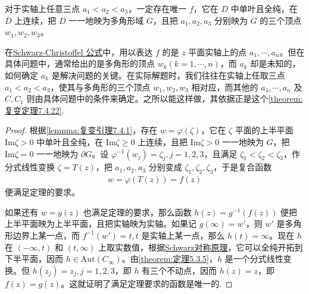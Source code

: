 \documentclass[../../main.tex]{subfiles}%
\begin{document}
\begin{theorem}\label{theorem:复变定理7.4.22}
对于实轴上任意三点 \(a_1<a_2<a_3\)，一定存在唯一 \(f\)，它在 \(D\) 中单叶且全纯，在 \(\overline{D}\) 上连续，把 \(D\) 一一地映为多角形域 \(G\)，且把 \(a_1,a_2,a_3\) 分别映为 \(G\) 的三个顶点 \(w_1,w_2,w_3\)。
\end{theorem}
\begin{remark}
在\hyperref[eq:Schwarz-Christoffel公式]{Schwarz-Christoffel 公式}中，用以表达 \(f\) 的是 \(z\) 平面实轴上的点 \(a_1,\cdots,a_n\)。但在具体问题中，通常给出的是多角形的顶点 \(w_k(k=1,\cdots,n)\)，而 \(a_k\) 却是未知的，如何确定 \(a_k\) 是解决问题的关键。在实际解题时，我们往往在实轴上任取三点 \(a_1<a_2<a_3\)，使其与多角形的三个顶点 \(w_1,w_2,w_3\) 相对应，而其他的 \(a_4,\cdots,a_n\) 及 \(C, C_1\) 则由具体问题中的条件来确定。之所以能这样做，其依据正是这个\cref{theorem:复变定理7.4.22}.
\end{remark}
\begin{proof}
根据\cref{lemnma:复变引理7.4.1}，存在 \(w=\varphi(\zeta)\)，它在 \(\zeta\) 平面的上半平面 \(\mathrm{Im}\zeta>0\) 中单叶且全纯，在 \(\mathrm{Im}\zeta \geqslant 0\) 上连续，且把 \(\mathrm{Im}\zeta>0\) 一一地映为 \(G\)，把 \(\mathrm{Im}\zeta=0\) 一一地映为 \(\partial G\)。设 \(\varphi^{-1}(w_j)=\zeta_j, j=1,2,3\)，且满足 \(\zeta_1<\zeta_2<\zeta_3\)，作分式线性变换 \(\zeta=T(z)\)，把 \(a_1,a_2,a_3\) 分别变成 \(\zeta_1,\zeta_2,\zeta_3\)，于是复合函数
\begin{align*}
w = \varphi(T(z)) = f(z)
\end{align*}
便满足定理的要求。

如果还有 \(w=g(z)\) 也满足定理的要求，那么函数 \(h(z)=g^{-1}(f(z))\) 便把上半平面映为上半平面，且把实轴映为实轴。如果记 \(g(\infty)=w'\)，则 \(w'\) 是多角形边界上某一点，而 \(f^{-1}(w')=t, t\) 是实轴上某一点，那么 \(h(t)=\infty\)。现在 \(h\) 在 \((-\infty, t)\) 和 \((t, \infty)\) 上取实数值，根据\hyperref[theorem:双全纯映射的Schwarz对称原理]{Schwarz对称原理}，它可以全纯开拓到下半平面，因而 \(h \in \mathrm{Aut}(C_\infty)\)。由\cref{theorem:定理5.3.5}，\(h\) 是一个分式线性变换。但 \(h(z_j)=z_j, j=1,2,3\)，即 \(h\) 有三个不动点，因而 \(h(z)=z\)，即 \(f(z)=g(z)\)。这就证明了满足定理要求的函数是唯一的.
\end{proof}
\end{document}
